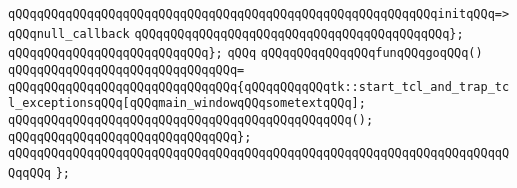 \verb|qQQqqQQqqQQqqQQqqQQqqQQqqQQqqQQqqQQqqQQqqQQqqQQqqQQqqQQqqQQqinitqQQq=>qQQqnull_callback|\newline
\verb|qQQqqQQqqQQqqQQqqQQqqQQqqQQqqQQqqQQqqQQqqQQq};|\newline
\verb|qQQqqQQqqQQqqQQqqQQqqQQqqQQq};|\newline
\verb|qQQq|\newline
\verb|qQQqqQQqqQQqqQQqfunqQQqgoqQQq()|\newline
\verb|qQQqqQQqqQQqqQQqqQQqqQQqqQQqqQQq=|\newline
\verb|qQQqqQQqqQQqqQQqqQQqqQQqqQQqqQQq{qQQqqQQqqQQqtk::start_tcl_and_trap_tcl_exceptionsqQQq[qQQqmain_windowqQQqsometextqQQq];|\newline
\verb|qQQqqQQqqQQqqQQqqQQqqQQqqQQqqQQqqQQqqQQqqQQqqQQq();|\newline
\verb|qQQqqQQqqQQqqQQqqQQqqQQqqQQqqQQq};|\newline
\verb|qQQqqQQqqQQqqQQqqQQqqQQqqQQqqQQqqQQqqQQqqQQqqQQqqQQqqQQqqQQqqQQqqQQqqQQqqQQq|\newline
\verb|};|\newline
\newline
\newline

